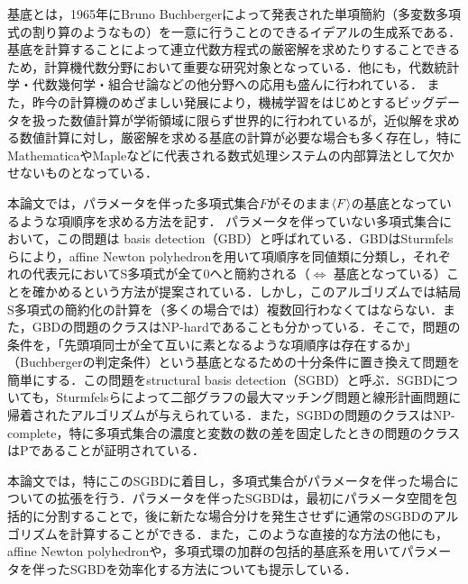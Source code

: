 \groebner{}基底とは，1965年にBruno Buchbergerによって発表された単項簡約（多変数多項式の割り算のようなもの）を一意に行うことのできるイデアルの生成系である．\groebner{}基底を計算することによって連立代数方程式の厳密解を求めたりすることできるため，計算機代数分野において重要な研究対象となっている．他にも，代数統計学・代数幾何学・組合せ論などの他分野への応用も盛んに行われている．
また，昨今の計算機のめざましい発展により，機械学習をはじめとするビッグデータを扱った数値計算が学術領域に限らず世界的に行われているが，近似解を求める数値計算に対し，厳密解を求める\groebner{}基底の計算が必要な場合も多く存在し，特にMathematicaやMapleなどに代表される数式処理システムの内部算法として欠かせないものとなっている．
\par
本論文では，パラメータを伴った多項式集合$F$がそのまま$\langle F \rangle$の\groebner{}基底となっているような項順序を求める方法を記す．
パラメータを伴っていない多項式集合において，この問題は\groebner{} basis detection（GBD）と呼ばれている．GBDはSturmfelsらにより，affine Newton polyhedronを用いて項順序を同値類に分類し，それぞれの代表元においてS多項式が全て$0$へと簡約される（$\Leftrightarrow$ \groebner{}基底となっている）ことを確かめるという方法が提案されている\cite{gritzmann1993minkowski}．しかし，このアルゴリズムでは結局S多項式の簡約化の計算を（多くの場合では）複数回行わなくてはならない．また，GBDの問題のクラスはNP-hardであることも分かっている\cite[Corollary11]{sturmfels1997structural}．そこで，問題の条件を，「先頭項同士が全て互いに素となるような項順序は存在するか」（Buchbergerの判定条件）という\groebner{}基底となるための十分条件に置き換えて問題を簡単にする．この問題をstructural \groebner{} basis detection（SGBD）と呼ぶ．SGBDについても，Sturmfelsらによって二部グラフの最大マッチング問題と線形計画問題に帰着されたアルゴリズムが与えられている．また，SGBDの問題のクラスはNP-complete\cite[Theorem2]{sturmfels1997structural}，特に多項式集合の濃度と変数の数の差を固定したときの問題のクラスはPである\cite[Corollary3]{sturmfels1997structural}ことが証明されている．
\par
本論文では，特にこのSGBDに着目し，多項式集合がパラメータを伴った場合についての拡張を行う．パラメータを伴ったSGBDは，最初にパラメータ空間を包括的に分割することで，後に新たな場合分けを発生させずに通常のSGBDのアルゴリズムを計算することができる．また，このような直接的な方法の他にも，affine Newton polyhedronや，多項式環の加群の包括的\groebner{}基底系を用いてパラメータを伴ったSGBDを効率化する方法についても提示している．








